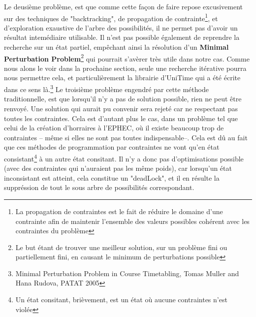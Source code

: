 \indent
Le deusième problème, est que comme cette façon de faire repose excusivement sur des techniques de "backtracking", de propagation de contrainte\footnote{La propagation de contraintes est le fait de réduire le domaine d'une contrainte afin de maintenir l'ensemble des valeurs possibles cohérent avec les contraintes du problème},
et d'exploration exaustive de l'arbre des possibilités, il  ne permet pas d'avoir un résultat intemédiaire utilisable.  
Il n'est pas possible également de reprendre la recherche sur un état partiel, empêchant ainsi la résolution d'un \textbf{Minimal Perturbation Problem}\footnote{Le but étant de trouver une meilleur solution, sur un problème fini ou partiellement fini, en causant le minimum de perturbations possible} qui pourrait s'avèrer très utile dans notre cas. \newline
Comme nous alons le voir dans la prochaine section, seule une recherche itérative pourra nous permettre cela, et particulièrement la librairie d'UniTime qui a été écrite dans ce sens là.\footnote{Minimal Perturbation Problem in Course Timetabling, Tomas Muller and Hana Rudova, PATAT 2005 }
\newline
\indent
Le troisième problème engendré par cette méthode traditionnelle, est que lorsqu'il n'y a pas de solution possible, rien ne peut être renvoyé.  Une solution qui aurait pu convenir sera rejeté car ne respectant pas toutes les contraintes. Cela est d'autant plus le cas, dans un problème tel que 
celui de la création d'horraires à l'EPHEC, où il existe beaucoup trop de contraintes -- même si elles ne sont pas toutes indispensable--.  Cela est dû au fait que ces méthodes de programmation par contraintes ne vont qu'en état consistant\footnote{Un état consitant, brièvement, est un état où aucune contraintes n'est violée} à un autre état consitant. Il n'y a donc pas d'optimisations possible (avec des contraintes qui n'auraient pas les même poids), car lorsqu'un état inconsistant est atteint, cela constitue un "deadLock", et il en résulte la suppréssion de tout le sous arbre de possibilités correspondant.\newline
